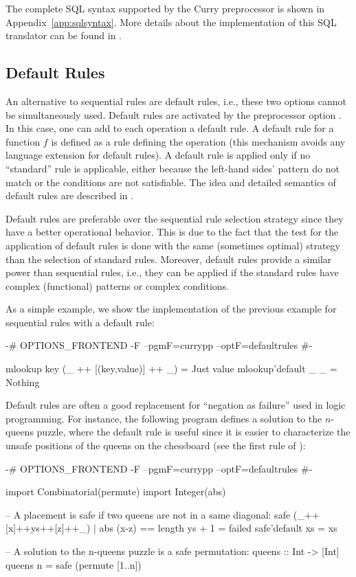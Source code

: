 The complete SQL syntax supported by the Curry preprocessor
is shown in Appendix~\ref{app:sqlsyntax}.
More details about the implementation of this
SQL translator can be found in \cite{HanusKrone17EPTCS,Krone15}.


\subsection{Default Rules}

An alternative to sequential rules are default rules, i.e.,
these two options cannot be simultaneously used.
Default rules are activated by the preprocessor option
.
In this case, one can add to each operation a default rule.
A default rule for a function $f$ is defined as a rule
defining the operation  (this mechanism
avoids any language extension for default rules).
A default rule is applied only if no ``standard'' rule is
applicable, either because the left-hand sides' pattern do not match
or the conditions are not satisfiable.
The idea and detailed semantics of
default rules are described in \cite{AntoyHanus16PADL}.

Default rules are preferable over the sequential rule selection
strategy since they have a better operational behavior.
This is due to the fact that the test for the application
of default rules is done with the same (sometimes optimal)
strategy than the selection of standard rules.
Moreover, default rules provide a similar power than sequential rules,
i.e., they can be applied if the standard rules have
complex (functional) patterns or complex conditions.

As a simple example, we show the implementation of the
previous example for sequential rules with a default rule:
%
\begin{curry}
{-# OPTIONS_FRONTEND -F --pgmF=currypp --optF=defaultrules #-}

mlookup key (_ ++ [(key,value)] ++ _) = Just value
mlookup'default _   _                 = Nothing 
\end{curry}
%
Default rules are often a good replacement for ``negation as failure''
used in logic programming.
For instance, the following program defines a solution
to the $n$-queens puzzle, where the default rule is useful
since it is easier to characterize the unsafe positions
of the queens on the chessboard (see the first rule of ):
%
\begin{curry}
{-# OPTIONS_FRONTEND -F --pgmF=currypp --optF=defaultrules #-}

import Combinatorial(permute)
import Integer(abs)

-- A placement is safe if two queens are not in a same diagonal:
safe (_++[x]++ys++[z]++_) | abs (x-z) == length ys + 1 = failed
safe'default xs = xs

-- A solution to the n-queens puzzle is a safe permutation:
queens :: Int -> [Int]
queens n = safe (permute [1..n])
\end{curry}

